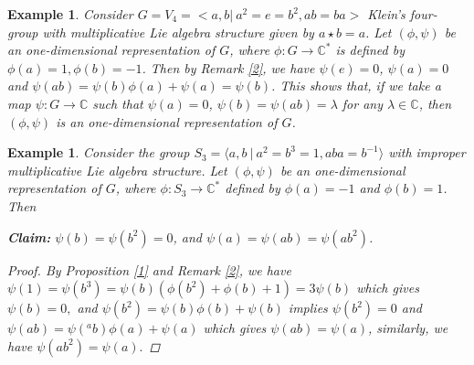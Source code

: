 \documentclass[10 pt,oneside,reqno,a4paper]{amsart}
\newtheorem{example}[theorem]{Example}
\numberwithin{equation}{section}
\newcommand{\field}[1]{\mathbb{#1}}          \newcommand{\Q}{\field{Q}}
\newcommand{\C}{\field{C}}                   \newcommand{\A}{\field{A}}
\begin{document}
\begin{example}
    Consider $G=V_4=<a,b| ~ a^2=e=b^2, ab=ba>$ Klein's four-group with multiplicative Lie algebra structure given by $a\star b=a$.
    Let $(\phi,\psi)$ be an one-dimensional representation of $G$, where $\phi: G\to \C^*$ is defined by $\phi(a)=1,\phi(b)=-1$. Then by Remark \ref{2}, we have  $\psi(e)=0$,  $\psi(a)=0$ and
    $\psi(ab)=\psi(b)\phi(a)+ \psi(a)=\psi(b)$. This shows that, if we take a map $\psi: G \to \C$ such that $\psi(a)=0$, $\psi(b) =\psi(ab)= \lambda $  for any $\lambda \in \C$, then $(\phi,\psi)$ is an one-dimensional representation of $G$.
\end{example}
\begin{example}
    Consider the group $S_3 = \langle a,b ~|~ a^2 = b^3 =1, aba = b^{-1}\rangle$ with improper multiplicative Lie algebra structure. Let $(\phi,\psi)$ be an one-dimensional representation of $G$, where 
$\phi: S_3 \rightarrow \C^*$ defined by $\phi(a)=-1$ and $\phi(b)=1$. Then

 \noindent\textbf{Claim:} $\psi(b)=\psi(b^2)=0$, and $\psi(a) =\psi(ab)=\psi(ab^2)$.
\begin{proof}
  By Proposition \ref{1} and Remark \ref{2}, we have 
$\psi(1)=\psi(b^3)=\psi(b)(\phi(b^2)+ \phi(b)+ 1)=3\psi(b)$ which gives $\psi(b)=0,$ and 
$\psi(b^2)=\psi(b)\phi(b)+ \psi(b)$ implies $\psi(b^2)=0$ and $\psi(ab)=\psi({^ab})\phi(a)+ \psi(a)$ which gives $\psi(ab)=\psi(a)$, similarly, we have $\psi(ab^2)=\psi(a).$  
\end{proof}
  
\end{example}
\end{document}
